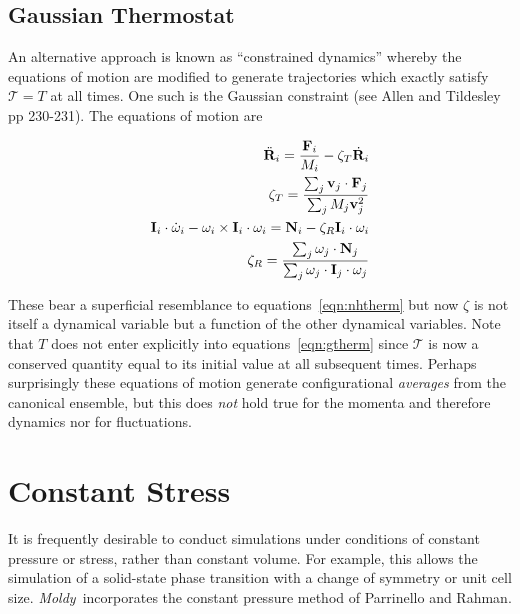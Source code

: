 \documentclass[a4paper,twoside]{report}
\newcommand{\bm}[1]{\mathbf{#1}}
\newcommand{\moldy}{\emph{Moldy}}
\begin{document}
\subsection{Gaussian Thermostat}
An alternative approach is known as ``constrained dynamics'' whereby
the equations of motion are modified to generate trajectories which
exactly satisfy ${\mathcal T} = T$ at all times.  One such is the Gaussian
constraint (see Allen and Tildesley\cite{allen:87} pp 230-231). The
equations of motion are 

\begin{eqnarray}
\label{eqn:gtherm}
\itemsep=0.5em
\ddot{\bm{R}}_i = \frac{\bm{F}_i}{M_i} - \zeta_T \dot{\bm{R}}_i \nonumber \\
\zeta_T = \frac{\sum_j\bm{v}_j \cdot \bm{F}_j}{\sum_j M_j\bm{v}_j^2} \\
\bm{I}_i \cdot \dot{\bm\omega}_i - \bm\omega_i \times \bm{I}_i
\cdot
\bm\omega_i = \bm{N}_i - \zeta_R \bm{I}_i \cdot \bm\omega_i \nonumber \\
\zeta_R = \frac{\sum_j\bm\omega_j \cdot \bm{N}_j}{\sum_j
  \bm\omega_j \cdot \bm{I}_j \cdot \bm\omega_j}\nonumber
\end{eqnarray}

These bear a superficial resemblance to equations~\ref{eqn:nhtherm}
but now $\zeta$ is not itself a dynamical variable but a function of the
other dynamical variables.  Note
that $T$ does not enter explicitly into  equations~\ref{eqn:gtherm}
since ${\mathcal T}$ is now a conserved quantity equal to its initial
value at all subsequent times. Perhaps surprisingly these equations of
motion generate configurational \emph{averages} from the canonical
ensemble, but this does \emph{not} hold true for the momenta and
therefore dynamics nor for fluctuations. 

\section{Constant Stress}%
\label{sec:const-stress}
It is frequently desirable to conduct simulations under conditions of
constant pressure or stress, rather than constant volume.  For
example, this allows the simulation of a solid-state phase transition
with a change of symmetry or unit cell size.  \moldy\ incorporates the
constant pressure method of Parrinello and Rahman\cite{parrinello:81}.
\end{document}
